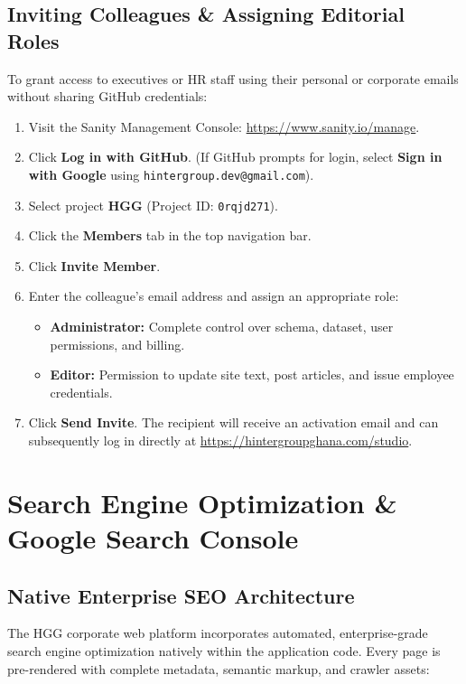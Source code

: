 \documentclass[11pt,a4paper,oneside]{book}
\begin{document}
\section{Inviting Colleagues \& Assigning Editorial Roles}
To grant access to executives or HR staff using their personal or corporate emails without sharing GitHub credentials:
\begin{enumerate}[leftmargin=*,label=\textbf{\arabic*.}]
  \item Visit the Sanity Management Console: \url{https://www.sanity.io/manage}.
  \item Click \textbf{Log in with GitHub}. (If GitHub prompts for login, select \textbf{Sign in with Google} using \texttt{hintergroup.dev@gmail.com}).
  \item Select project \textbf{HGG} (Project ID: \texttt{0rqjd271}).
  \item Click the \textbf{Members} tab in the top navigation bar.
  \item Click \textbf{Invite Member}.
  \item Enter the colleague's email address and assign an appropriate role:
    \begin{itemize}
      \item \textbf{Administrator:} Complete control over schema, dataset, user permissions, and billing.
      \item \textbf{Editor:} Permission to update site text, post articles, and issue employee credentials.
    \end{itemize}
  \item Click \textbf{Send Invite}. The recipient will receive an activation email and can subsequently log in directly at \url{https://hintergroupghana.com/studio}.
\end{enumerate}

\chapter{Search Engine Optimization \& Google Search Console}
\label{chap:seo}

\section{Native Enterprise SEO Architecture}
The HGG corporate web platform incorporates automated, enterprise-grade search engine optimization natively within the application code. Every page is pre-rendered with complete metadata, semantic markup, and crawler assets:
\end{document}
